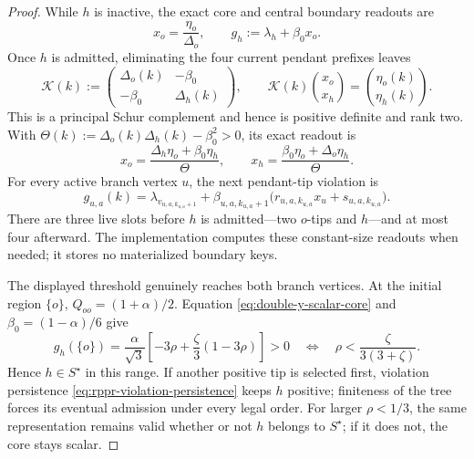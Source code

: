 \begin{proof}
While $h$ is inactive, the exact core and central boundary readouts are
\begin{equation}
 x_o=\frac{\eta_o}{\Delta_o},
 \qquad
 g_h:=\lambda_h+\beta_0x_o.
 \label{eq:double-y-scalar-core}
\end{equation}
Once $h$ is admitted, eliminating the four current pendant prefixes leaves
\begin{equation}
 \mathcal K(k):=
 \begin{pmatrix}
  \Delta_o(k)&-\beta_0\\
  -\beta_0&\Delta_h(k)
 \end{pmatrix},
 \qquad
 \mathcal K(k)\binom{x_o}{x_h}=\binom{\eta_o(k)}{\eta_h(k)}.
 \label{eq:double-y-rank-two-core}
\end{equation}
This is a principal Schur complement and hence is positive definite and rank
two.  With
$\Theta(k):=\Delta_o(k)\Delta_h(k)-\beta_0^2>0$, its exact readout is
\begin{equation}
 x_o=\frac{\Delta_h\eta_o+\beta_0\eta_h}{\Theta},
 \qquad
 x_h=\frac{\beta_0\eta_o+\Delta_o\eta_h}{\Theta}.
 \label{eq:double-y-core-readout}
\end{equation}
For every active branch vertex $u$, the next pendant-tip violation is
\begin{equation}
 g_{u,a}(k)
 =\lambda_{v_{u,a,k_{u,a}+1}}
  +\beta_{u,a,k_{u,a}+1}
   \bigl(r_{u,a,k_{u,a}}x_u+s_{u,a,k_{u,a}}\bigr).
 \label{eq:double-y-tip-readout}
\end{equation}
There are three live slots before $h$ is admitted---two $o$-tips and $h$---and
at most four afterward.  The implementation computes these constant-size
readouts when needed; it stores no materialized boundary keys.

The displayed threshold genuinely reaches both branch vertices.  At the
initial region $\{o\}$, $Q_{oo}=(1+\alpha)/2$.  Equation
\eqref{eq:double-y-scalar-core} and $\beta_0=(1-\alpha)/6$ give
\begin{equation*}
 g_h(\{o\})
 =\frac{\alpha}{\sqrt3}
   \left[-3\rho+\frac{\zeta}{3}(1-3\rho)\right]>0
 \quad\Longleftrightarrow\quad
 \rho<\frac{\zeta}{3(3+\zeta)}.
\end{equation*}
Hence $h\in S^\star$ in this range.  If another positive tip is selected
first, violation persistence
\eqref{eq:rppr-violation-persistence} keeps $h$ positive; finiteness of the
tree forces its eventual admission under every legal order.  For larger
$\rho<1/3$, the same representation remains valid whether or not $h$ belongs
to $S^\star$; if it does not, the core stays scalar.


\end{proof}
